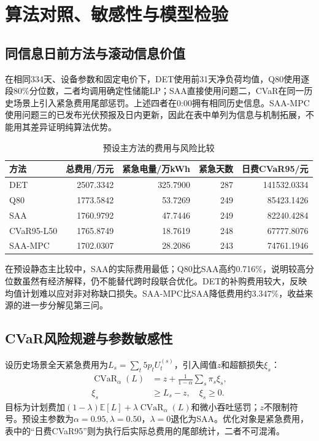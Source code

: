 \section{算法对照、敏感性与模型检验}
\subsection{同信息日前方法与滚动信息价值}
在相同334天、设备参数和固定电价下，DET使用前31天净负荷均值，Q80使用逐段80\%分位数，二者均调用确定性储能LP；SAA直接使用问题二，CVaR在同一历史场景上引入紧急费用尾部惩罚。上述四者在0:00拥有相同历史信息。SAA-MPC使用问题三的已发布光伏预报及日内更新，因此在表中单列为信息与机制拓展，不能用其差异证明纯算法优势。

\begin{table}[H]\centering\small
\caption{预设主方法的费用与风险比较}
\begin{tabular}{lrrrr}\toprule
方法 & 总费用/万元 & 紧急电量/万kWh & 紧急天数 & 日费CVaR95/元\\\midrule
DET & 2507.3342 & 325.7900 & 287 & 141532.0334\\
Q80 & 1773.5842 & 53.7269 & 249 & 85423.1426\\
SAA & 1760.9792 & 47.7446 & 249 & 82240.4284\\
CVaR95-L50 & 1765.8749 & 18.7619 & 248 & 67777.8076\\
SAA-MPC & 1702.0307 & 28.2086 & 243 & 74761.1946\\
\bottomrule\end{tabular}\end{table}
在预设静态主比较中，SAA的实际费用最低；Q80比SAA高约0.716\%，说明较高分位数虽然有经济解释，仍不能替代跨时段联合优化。DET的补购费用较大，反映均值计划难以应对非对称缺口损失。SAA-MPC比SAA降低费用约3.347\%，收益来源的进一步分解见第三问。

\subsection{CVaR风险规避与参数敏感性}
设历史场景全天紧急费用为$L_s=\sum_t5p_tU_t^{(s)}$，引入阈值$z$和超额损失$\xi_s$：
\begin{align}
\operatorname{CVaR}_{\alpha}(L)&=z+\frac{1}{1-\alpha}\sum_s\pi_s\xi_s,\\
\xi_s&\geq L_s-z,\quad\xi_s\geq0.
\end{align}
目标为计划费加$(1-\lambda)\mathbb E[L]+\lambda\operatorname{CVaR}_{\alpha}(L)$和微小吞吐惩罚；$z$不限制符号。预设主参数为$\alpha=0.95,\lambda=0.50$，$\lambda=0$退化为SAA。优化对象是紧急费用，表中的“日费CVaR95”则为执行后实际总费用的尾部统计，二者不可混淆。

